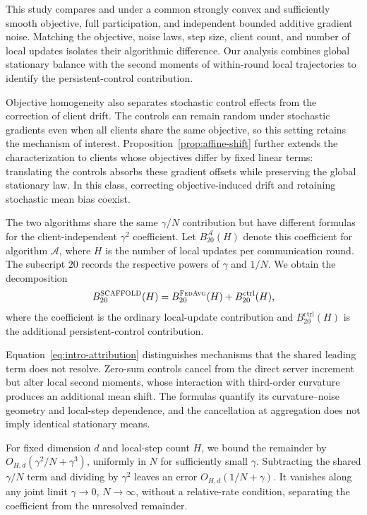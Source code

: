 This study compares \Scaf{} and \FedAvg{} under a common strongly convex and sufficiently smooth objective, full participation, and independent bounded additive gradient noise. Matching the objective, noise laws, step size, client count, and number of local updates isolates their algorithmic difference. Our analysis combines global stationary balance with the second moments of within-round local trajectories to identify the persistent-control contribution.

Objective homogeneity also separates stochastic control effects from the correction of client drift. The controls can remain random under stochastic gradients even when all clients share the same objective, so this setting retains the mechanism of interest. Proposition~\ref{prop:affine-shift} further extends the \Scaf{} characterization to clients whose objectives differ by fixed linear terms: translating the controls absorbs these gradient offsets while preserving the global stationary law. In this class, correcting objective-induced drift and retaining stochastic mean bias coexist.

The two algorithms share the same $\gamma/N$ contribution but have different formulas for the client-independent $\gamma^2$ coefficient. Let $B_{20}^{\mathcal A}(H)$ denote this coefficient for algorithm $\mathcal A$, where $H$ is the number of local updates per communication round. The subscript $20$ records the respective powers of $\gamma$ and $1/N$. We obtain the decomposition
\begin{equation}
\label{eq:intro-attribution}
B_{20}^{\textnormal{\textsc{SCAFFOLD}}}(H)
=
B_{20}^{\textnormal{\textsc{FedAvg}}}(H)
+
B_{20}^{\mathrm{ctrl}}(H),
\end{equation}
where the \FedAvg{} coefficient is the ordinary local-update contribution and $B_{20}^{\mathrm{ctrl}}(H)$ is the additional persistent-control contribution.

Equation~\eqref{eq:intro-attribution} distinguishes mechanisms that the shared leading term does not resolve. Zero-sum controls cancel from the direct server increment but alter local second moments, whose interaction with third-order curvature produces an additional mean shift. The formulas quantify its curvature--noise geometry and local-step dependence, and the cancellation at aggregation does not imply identical stationary means.

For fixed dimension $d$ and local-step count $H$, we bound the remainder by $O_{H,d}(\gamma^2/N+\gamma^3)$, uniformly in $N$ for sufficiently small $\gamma$. Subtracting the shared $\gamma/N$ term and dividing by $\gamma^2$ leaves an error $O_{H,d}(1/N+\gamma)$. It vanishes along any joint limit $\gamma\to0$, $N\to\infty$, without a relative-rate condition, separating the coefficient from the unresolved remainder.

